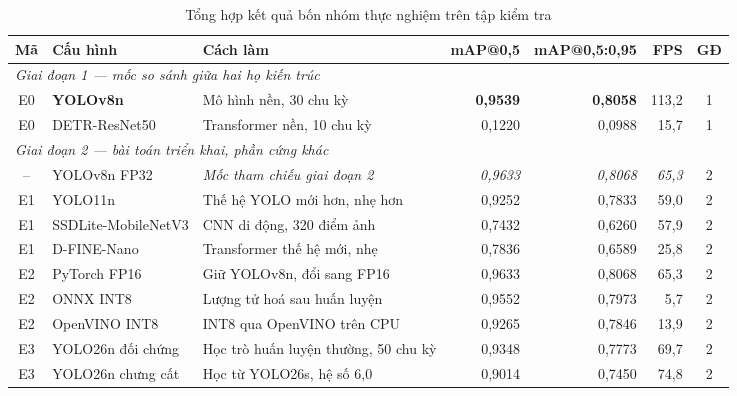 \begin{table}[H]
\centering
\caption{Tổng hợp kết quả bốn nhóm thực nghiệm trên tập kiểm tra}
\label{tab:tongquan}
\footnotesize
\begin{tabular}{clp{3.9cm}rrrc}
\toprule
\textbf{Mã} & \textbf{Cấu hình} & \textbf{Cách làm} & \textbf{mAP@0,5} & \textbf{mAP@0,5:0,95} & \textbf{FPS} & \textbf{GĐ} \\
\midrule
\multicolumn{7}{l}{\textit{Giai đoạn 1 --- mốc so sánh giữa hai họ kiến trúc}} \\
E0 & \textbf{YOLOv8n}      & Mô hình nền, 30 chu kỳ            & \textbf{0,9539} & \textbf{0,8058} & 113,2 & 1 \\
E0 & DETR-ResNet50         & Transformer nền, 10 chu kỳ        & 0,1220 & 0,0988 & 15,7  & 1 \\
\midrule
\multicolumn{7}{l}{\textit{Giai đoạn 2 --- bài toán triển khai, phần cứng khác}} \\
-- & YOLOv8n FP32          & \textit{Mốc tham chiếu giai đoạn 2}  & \textit{0,9633} & \textit{0,8068} & \textit{65,3} & 2 \\
E1 & YOLO11n               & Thế hệ YOLO mới hơn, nhẹ hơn      & 0,9252 & 0,7833 & 59,0 & 2 \\
E1 & SSDLite-MobileNetV3   & CNN di động, 320 điểm ảnh         & 0,7432 & 0,6260 & 57,9 & 2 \\
E1 & D-FINE-Nano           & Transformer thế hệ mới, nhẹ       & 0,7836 & 0,6589 & 25,8 & 2 \\
E2 & PyTorch FP16          & Giữ YOLOv8n, đổi sang FP16        & 0,9633 & 0,8068 & 65,3 & 2 \\
E2 & ONNX INT8             & Lượng tử hoá sau huấn luyện       & 0,9552 & 0,7973 & 5,7  & 2 \\
E2 & OpenVINO INT8         & INT8 qua OpenVINO trên CPU        & 0,9265 & 0,7846 & 13,9 & 2 \\
E3 & YOLO26n đối chứng     & Học trò huấn luyện thường, 50 chu kỳ & 0,9348 & 0,7773 & 69,7 & 2 \\
E3 & YOLO26n chưng cất     & Học từ YOLO26s, hệ số 6,0         & 0,9014 & 0,7450 & 74,8 & 2 \\
\bottomrule
\end{tabular}
\end{table}


